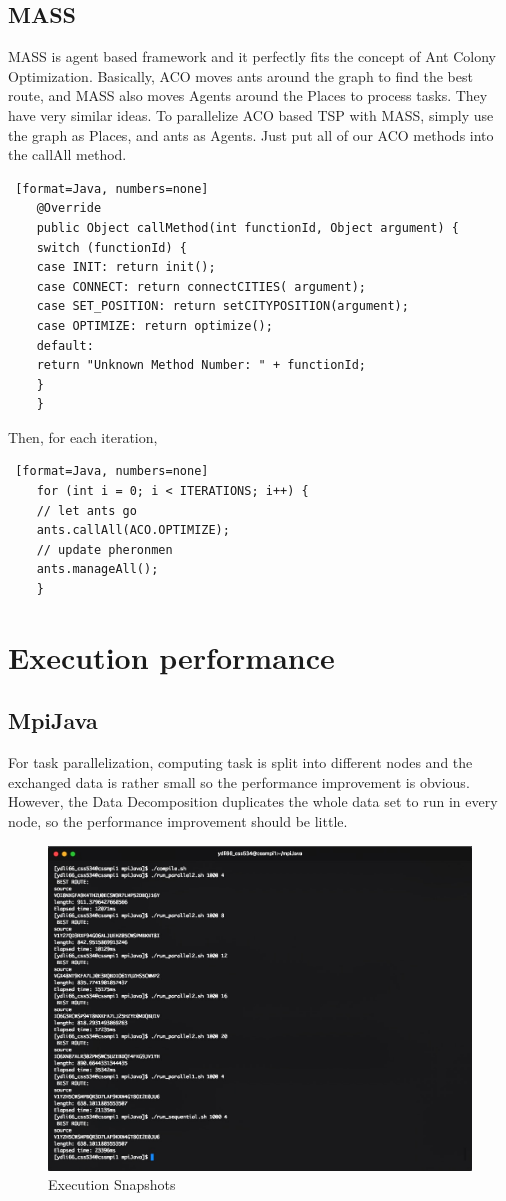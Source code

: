 \documentclass[11pt, letterpaper]{article}
\begin{document}
	\subsection{MASS}
	MASS is agent based framework and it perfectly fits the concept of Ant Colony Optimization. Basically, ACO moves ants around the graph to find the best route, and MASS also moves Agents around the Places to process tasks. They have very similar ideas. To parallelize ACO based TSP with MASS, simply use the graph as Places, and ants as Agents. Just put all of our ACO methods into the callAll method.
	\begin{lstlisting} [format=Java, numbers=none]
	@Override
	public Object callMethod(int functionId, Object argument) {
	switch (functionId) {
	case INIT: return init();
	case CONNECT: return connectCITIES( argument);
	case SET_POSITION: return setCITYPOSITION(argument);
	case OPTIMIZE: return optimize();
	default:
	return "Unknown Method Number: " + functionId;
	}
	}
	\end{lstlisting}
	Then, for each iteration, 
	\begin{lstlisting} [format=Java, numbers=none]
	for (int i = 0; i < ITERATIONS; i++) {
	// let ants go
	ants.callAll(ACO.OPTIMIZE);
	// update pheronmen
	ants.manageAll();
	}
	\end{lstlisting}
	
	
	\section {Execution performance}
	
	\subsection{MpiJava}
	For task parallelization, computing task is split into different nodes and the exchanged data is rather small so the performance improvement is obvious. However, the Data Decomposition duplicates the whole data set to run in every node, so the performance improvement should be little.
	
	\begin{figure}[H]
		\centering
		\includegraphics[width=0.7\linewidth]{running}
		\caption{Execution Snapshots}
		\label{fig:running}
	\end{figure}
	
\end{document}
